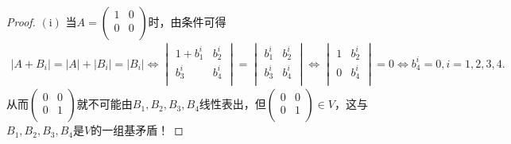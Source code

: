 \documentclass[../../main.tex]{subfiles}%
\begin{document}
\begin{proof}
$\left( \mathrm{i} \right)$ 当$A=\begin{pmatrix}
1&		0\\
0&		0\\
\end{pmatrix}$时，由条件可得
\begin{align*}
\left| A+B_i \right|=\left| A \right|+\left| B_i \right|=\left| B_i \right|\Longleftrightarrow \begin{vmatrix}
1+b_{1}^{i}&		b_{2}^{i}\\
b_{3}^{i}&		b_{4}^{i}\\
\end{vmatrix}=\begin{vmatrix}
b_{1}^{i}&		b_{2}^{i}\\
b_{3}^{i}&		b_{4}^{i}\\
\end{vmatrix}
\Longleftrightarrow \begin{vmatrix}
1&		b_{2}^{i}\\
0&		b_{4}^{i}\\
\end{vmatrix}=0\Longleftrightarrow b_{4}^{i}=0,i=1,2,3,4.
\end{align*}
从而$\begin{pmatrix}
0&		0\\
0&		1\\
\end{pmatrix}$就不可能由$B_1,B_2,B_3,B_4$线性表出，但$\begin{pmatrix}
0&		0\\
0&		1\\
\end{pmatrix} \in V$，这与$B_1,B_2,B_3,B_4$是$V$的一组基矛盾！


\end{proof}
\end{document}
